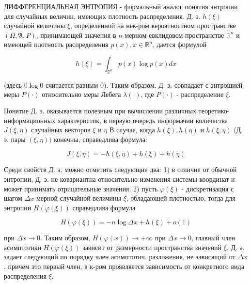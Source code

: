 \documentclass[10pt]{article}
\begin{document}
ДИФФЕРЕНЦИАЛЬНАЯ ЭНТРОПИЯ - формальный аналог понятия энтропии для случайных величин, имеющих плотность распределения. Д. э. $h(\xi)$ случайной величины $\xi$, определенной на нек-ром вероятностном пространстве $(\Omega, \mathfrak{A}, P)$, принимающей значения в $n$-мерном евклидовом пространстве $\mathbb{R}^{n}$ и имеющей плотность распределения $p(x), x \in \mathbb{R}^{n}$, дается формулой



\[

h(\xi)=\int_{\mathbb{R}^{n}} p(x) \log p(x) d x

\]



(здесь $0 \log 0$ считается равным 0). Таким образом, Д. э. совпадает с энтрошией меры $P(\cdot)$ относительно меры Лебега $\lambda(\cdot)$, где $P(\cdot)$ - распределение $\xi$.



Понятие Д. э. оказывается полезным при вычислении различных теоретико-информационных характеристик, в первую очередь информачии количества $J(\xi, \eta)$ случайных векторов $\xi$ и $\eta$ В случае, когда $h(\xi), h(\eta)$ и $h(\xi, \eta)$ (Д. э. пары $(\xi, \eta))$ конечны, справедлива формула:



\[

J(\xi, \eta)=-h(\xi, \eta)+h(\xi)+h(\eta)

\]



Среди свойств Д. э. можно отметить следующие два: 1) в отличие от обычной энтропии, Д. э. не ковариантна относительно изменения системы координат и может принимать отрицательные значения; 2) пусть $\varphi(\xi)$ - дискретизация с шагом $\Delta x$-мерной случайной величины $\xi$, обладающей плотностью, тогда для энтропии $H(\varphi(\xi))$ справедлива формула



\[

H(\varphi(\xi))=-n \log \Delta x+h(\xi)+o(1)

\]



при $\Delta x \rightarrow 0$. Таким образом, $H(\varphi(x)) \rightarrow+\infty$ при $\Delta x \rightarrow 0$, главный член асимптотики $H(\varphi(\xi))$ зависит от размерности пространства значений $\xi$, Д. ә. задает следующий по порядку член асимптотич. разложения, не зависящий от $\Delta x$, причем это первый член, в к-ром проявляется зависимость от конкретного вида распределения $\xi$.
\end{document}
